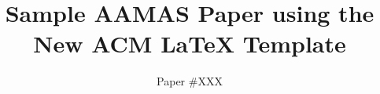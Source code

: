 \documentclass[sigconf]{aamas}  %
\begin{document}
\title{Sample AAMAS Paper using the New ACM LaTeX Template}  %


\author{Paper \#XXX}  %

%
%
%
%
%
%
%
%
\end{document}
